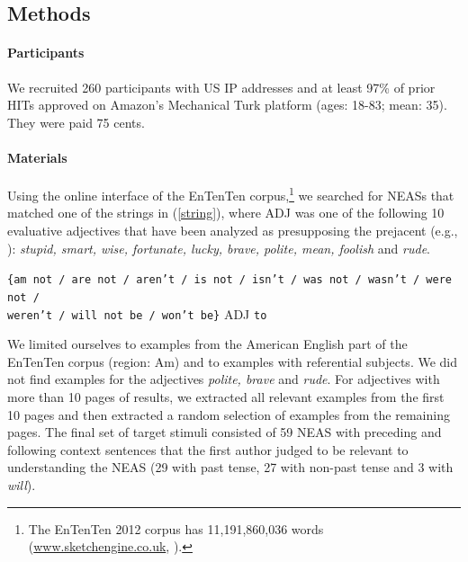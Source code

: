 \documentclass[11pt,fleqn]{article}
\newcommand{\6}{\mbox{$[\hspace*{-.6mm}[$}}
\newcommand{\9}{\mbox{$]\hspace*{-.6mm}]$}}
\begin{document}
\subsection{Methods}

\paragraph{Participants} We recruited 260 participants with US IP addresses and at least 97\% of prior HITs approved on Amazon's Mechanical Turk platform (ages: 18-83; mean: 35). They were paid 75 cents.  


\paragraph{Materials} Using the online interface of the EnTenTen corpus,\footnote{The EnTenTen 2012 corpus has 11,191,860,036 words
(\url{www.sketchengine.co.uk}, \citealt{ententen}).} we searched for NEASs that matched one of the strings in (\ref{string}), where ADJ was one of the following 10 evaluative adjectives that have been analyzed as presupposing the prejacent (e.g., \citealt{norrick78,karttunen-etal2014}): {\em stupid, smart, wise,
fortunate, lucky, brave, polite, mean, foolish} and {\em rude}.

\begin{exe}
\ex\label{string} {\tt \{am not / are not / aren't / is not / isn't / was not / wasn't / were not / \\ weren't / will not be / won't be\}} ADJ {\tt to}
\end{exe}
We limited ourselves to examples from the American English part of the EnTenTen corpus (region: Am) and to examples with referential subjects. We did not find examples for the adjectives {\em polite, brave} and {\em rude}. For adjectives with more than 10 pages of results, we extracted all relevant examples from the first 10 pages and then extracted a random selection of examples from the remaining pages. The final set of target stimuli consisted of 59 NEAS with preceding and following context sentences that the first author judged to be relevant to understanding the NEAS (29 with past tense, 27 with non-past tense and 3 with {\em will}).
\end{document}
